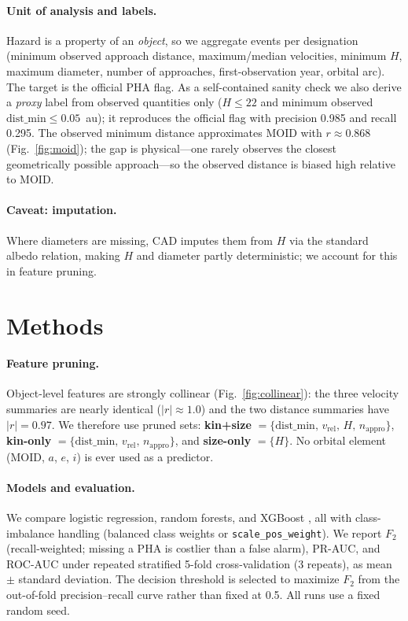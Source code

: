 \documentclass[11pt]{article}
\begin{document}
\paragraph{Unit of analysis and labels.}
Hazard is a property of an \emph{object}, so we aggregate events per designation
(minimum observed approach distance, maximum/median velocities, minimum $H$, maximum
diameter, number of approaches, first-observation year, orbital arc). The target is
the official PHA flag. As a self-contained sanity check we also derive a
\emph{proxy} label from observed quantities only ($H\le 22$ and minimum observed
$\mathrm{dist\_min}\le 0.05$~au); it reproduces the official flag with precision
0.985 and recall 0.295. The observed minimum distance approximates MOID with
$r\approx0.868$ (Fig.~\ref{fig:moid}); the gap is physical---one rarely observes the
closest geometrically possible approach---so the observed distance is biased high
relative to MOID.

\paragraph{Caveat: imputation.}
Where diameters are missing, CAD imputes them from $H$ via the standard albedo
relation, making $H$ and diameter partly deterministic; we account for this in
feature pruning.

\section{Methods}
\paragraph{Feature pruning.}
Object-level features are strongly collinear (Fig.~\ref{fig:collinear}): the three
velocity summaries are nearly identical ($|r|\approx1.0$) and the two distance
summaries have $|r|=0.97$. We therefore use pruned sets: \textbf{kin+size}
$=\{\mathrm{dist\_min},\, v_\mathrm{rel},\, H,\, n_\mathrm{appro}\}$, \textbf{kin-only}
$=\{\mathrm{dist\_min},\, v_\mathrm{rel},\, n_\mathrm{appro}\}$, and \textbf{size-only}
$=\{H\}$. No orbital element (MOID, $a$, $e$, $i$) is ever used as a predictor.

\paragraph{Models and evaluation.}
We compare logistic regression, random forests, and XGBoost \citep{xgboost,scikit-learn},
all with class-imbalance handling (balanced class weights or
\texttt{scale\_pos\_weight}). We report $F_2$ (recall-weighted; missing a PHA is
costlier than a false alarm), PR-AUC, and ROC-AUC under repeated stratified
5-fold cross-validation (3 repeats), as mean $\pm$ standard deviation. The decision
threshold is selected to maximize $F_2$ from the out-of-fold precision--recall curve
rather than fixed at 0.5. All runs use a fixed random seed.
\end{document}
